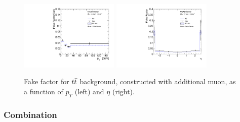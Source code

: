\begin{figure}[!htb]
  \centering
  \includegraphics[width=0.42\textwidth]{figures/VBSZZ/fakebkg/Muon_2Dff_ptttbarFakeFactorAddMuon_etapt_pavgy.pdf}
  \includegraphics[width=0.42\textwidth]{figures/VBSZZ/fakebkg/Muon_2Dff_etattbarFakeFactorAddMuon_etapt_pavgx.pdf}
  \caption{Fake factor for $t\bar{t}$ background, constructed with additional muon, as a function of $p_{T}$ (left) and $\eta$ (right).}
  \label{fig:fake_tt_mu}
\end{figure}

\iffalse
\subsubsection{Combination}

